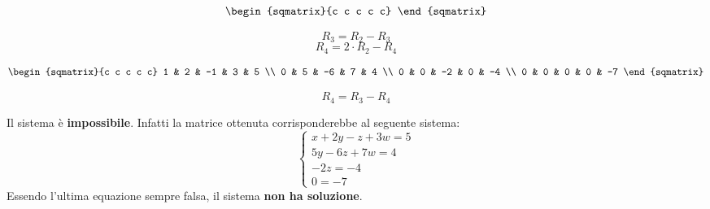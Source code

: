 \begin{esempio}
\begin{center}
\begin{minipage}{.4\textwidth}
\[\begin{sqmatrix}{c c c c c}
                \end{sqmatrix}
            \]
        \end{minipage}
        \begin{minipage}{.4\textwidth}
            \[
                R_3 = R_2 - R_3
            \]
            \[
                R_4 = 2 \cdot R_2 - R_4
            \]
        \end{minipage}
    \end{center}
    \begin{center}
        \begin{minipage}{.4\textwidth}
            \[
                \begin{sqmatrix}{c c c c c}
                    1 & 2 & -1 & 3 & 5 \\
                    0 & 5 & -6 & 7 & 4 \\
                    0 & 0 & -2 & 0 & -4 \\
                    0 & 0 & 0 & 0 & -7
                \end{sqmatrix}
            \]
        \end{minipage}
        \begin{minipage}{.4\textwidth}
            \[
                R_4 = R_3 - R_4
            \]
        \end{minipage}
    \end{center}
    Il sistema è \textbf{impossibile}. Infatti la matrice ottenuta corrisponderebbe al seguente sistema:
    \[
        \begin{cases}
            x + 2y - z + 3w = 5 \\
            5y - 6z + 7w = 4 \\
            -2z = -4 \\
            0 = -7
        \end{cases}
    \]
    Essendo l'ultima equazione sempre falsa, il sistema \textbf{non ha soluzione}.
\end{esempio}

